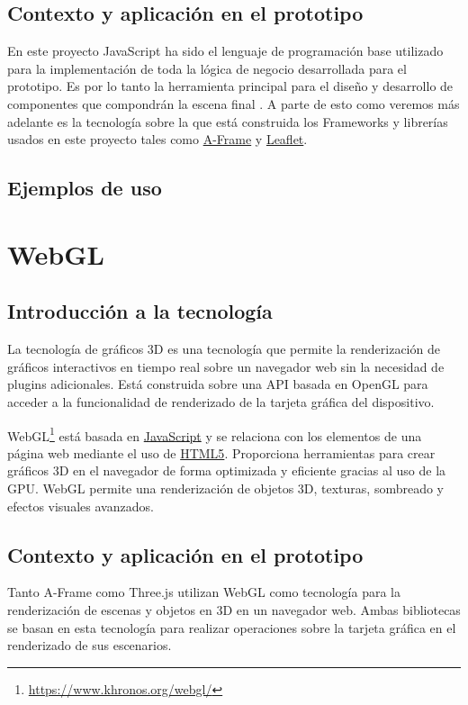 \documentclass[a4paper, 11pt]{book}
\begin{document}
\subsection{Contexto y aplicación en el prototipo}
En este proyecto JavaScript ha sido el lenguaje de programación base utilizado para la implementación de toda la lógica de negocio desarrollada para el prototipo. Es por lo tanto la herramienta principal para el diseño y desarrollo de componentes que compondrán la escena final . A parte de esto como veremos más adelante es la tecnología sobre la que está construida los Frameworks y librerías usados en este proyecto tales como \hyperref[sec:aframe]{A-Frame} y \hyperref[sec:leaflet]{Leaflet}.
\subsection{Ejemplos de uso}

\section{WebGL}
\label{sec:webgl}
\subsection{Introducción a la tecnología}
La tecnología de gráficos \Gls{3D} es una tecnología que permite la renderización de gráficos interactivos en tiempo real sobre un navegador web sin la necesidad de plugins adicionales. Está construida sobre una \Gls{API} basada en \Gls{OpenGL} para acceder a la funcionalidad de renderizado de la tarjeta gráfica del dispositivo.

WebGL\footnote{\url{https://www.khronos.org/webgl/}} está basada en \hyperref[sec:javascript]{JavaScript} y se relaciona con los elementos de una página web mediante el uso de \hyperref[sec:html5]{HTML5}. 
Proporciona herramientas para crear gráficos \Gls{3D} en el navegador de forma optimizada y eficiente gracias al uso de la \Gls{GPU}. WebGL permite una renderización de objetos 3D, texturas, sombreado y efectos visuales avanzados.
\subsection{Contexto y aplicación en el prototipo}
 Tanto A-Frame como Three.js utilizan WebGL como tecnología para la renderización de escenas y objetos en 3D en un navegador web. Ambas bibliotecas se basan en esta tecnología para realizar operaciones sobre la tarjeta gráfica en el renderizado de sus escenarios.
\end{document}
